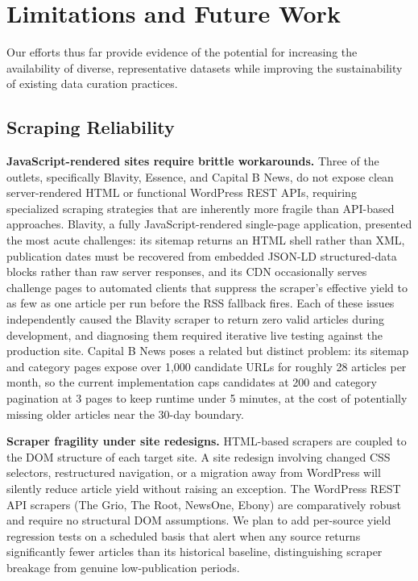 \documentclass[letterpaper]{article}
\begin{document}
\section{Limitations and Future Work}
\label{sec:limitations}

Our efforts thus far provide evidence of the potential for increasing
the availability of diverse, representative datasets while improving
the sustainability of existing data curation practices.

\subsection{Scraping Reliability}

\textbf{JavaScript-rendered sites require brittle workarounds.} Three
of the outlets, specifically Blavity, Essence, and Capital B News, do
not expose clean server-rendered HTML or functional WordPress REST
APIs, requiring specialized scraping strategies that are inherently
more fragile than API-based approaches. Blavity, a fully
JavaScript-rendered single-page application, presented the most acute
challenges: its sitemap returns an HTML shell rather than XML,
publication dates must be recovered from embedded JSON-LD
structured-data blocks rather than raw server responses, and its CDN
occasionally serves challenge pages to automated clients that suppress
the scraper's effective yield to as few as one article per run before
the RSS fallback fires. Each of these issues independently caused the
Blavity scraper to return zero valid articles during development, and
diagnosing them required iterative live testing against the production
site. Capital B News poses a related but distinct problem: its sitemap
and category pages expose over 1,000 candidate URLs for roughly 28
articles per month, so the current implementation caps candidates at
200 and category pagination at 3 pages to keep runtime under 5 minutes,
at the cost of potentially missing older articles near the 30-day
boundary.

\textbf{Scraper fragility under site redesigns.} HTML-based scrapers
are coupled to the DOM structure of each target site. A site redesign
involving changed CSS selectors, restructured navigation, or a
migration away from WordPress will silently reduce article yield
without raising an exception. The WordPress REST API scrapers (The
Grio, The Root, NewsOne, Ebony) are comparatively robust and require no
structural DOM assumptions. We plan to add per-source yield regression
tests on a scheduled basis that alert when any source returns
significantly fewer articles than its historical baseline,
distinguishing scraper breakage from genuine low-publication periods.
\end{document}
